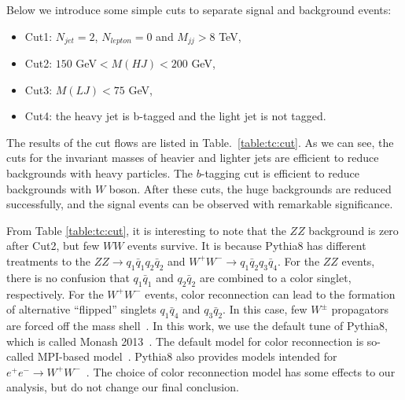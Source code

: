 \documentclass[a4paper,11pt]{article}
\begin{document}
Below we introduce some simple cuts to separate signal and background events:
\begin{itemize}
  \item Cut1: $N_{jet}=2$, $N_{lepton}=0$ and $M_{jj}>8$ TeV,
  \item Cut2: $150$ GeV$<M(HJ)<200$ GeV,
  \item Cut3: $M(LJ)<75$ GeV,
  \item Cut4: the heavy jet is b-tagged and the light jet is not tagged.
\end{itemize}
The results of the cut flows are listed in Table.~\ref{table:tc:cut}. 
As we can see, the cuts for the invariant masses of heavier and lighter jets are efficient to reduce backgrounds with heavy particles.
The $b$-tagging cut is efficient to reduce backgrounds with $W$ boson. 
After these cuts, the huge backgrounds are reduced successfully, 
and the signal events can be observed with remarkable significance. 

From Table \ref{table:tc:cut}, it is interesting to note that the $ZZ$ background is zero after Cut2, 
but few $WW$ events survive.
It is because Pythia8 has different treatments to the $ZZ\to q_1\bar{q}_1q_2\bar{q}_2$ and $W^+W^-\to q_1\bar{q}_2q_3\bar{q}_4$. 
For the $ZZ$ events, there is no confusion that $q_1\bar{q}_1$ and $q_2\bar{q}_2$ are combined to a color singlet, respectively. 
For the $W^+W^-$ events, color reconnection can lead to the formation of alternative ``flipped'' singlets $q_1\bar{q}_4$ and $q_3\bar{q}_2$. 
In this case, few $W^\pm$ propagators are forced off the mass shell~\cite{Sjostrand:1993hi}. 
In this work, we use the default tune of Pythia8, which is called Monash 2013~\cite{Skands:2014pea}. 
The default model for color reconnection is so-called MPI-based model~\cite{Sjostrand:1987su}. 
Pythia8 also provides models intended for $e^+e^-\to W^+W^-$~\cite{Sjostrand:1993hi,Sjostrand:1993rb}. 
The choice of color reconnection model has some effects to our analysis, 
but do not change our final conclusion. 
\end{document}
